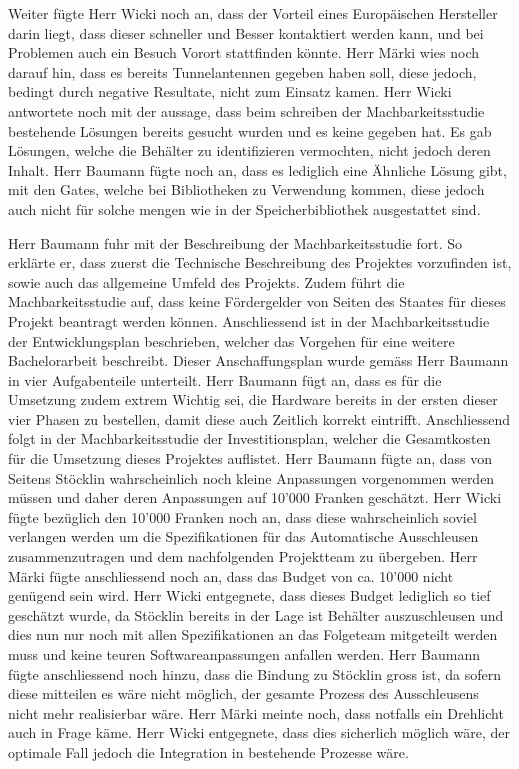 \documentclass[parskip=full, a4paper]{scrreprt}
\begin{document}
Weiter fügte Herr Wicki noch an, dass der Vorteil eines Europäischen Hersteller darin liegt, dass dieser schneller und Besser kontaktiert werden kann, und bei Problemen auch ein Besuch Vorort stattfinden könnte.
Herr Märki wies noch darauf hin, dass es bereits Tunnelantennen gegeben haben soll, diese jedoch, bedingt durch negative Resultate, nicht zum Einsatz kamen.
Herr Wicki antwortete noch mit der aussage, dass beim schreiben der Machbarkeitsstudie bestehende Lösungen bereits gesucht wurden und es keine gegeben hat. Es gab Lösungen, welche die Behälter zu identifizieren vermochten, nicht jedoch deren Inhalt. Herr Baumann fügte noch an, dass es lediglich eine Ähnliche Lösung gibt, mit den Gates, welche bei Bibliotheken zu Verwendung kommen, diese jedoch auch nicht für solche mengen wie in der Speicherbibliothek ausgestattet sind.

Herr Baumann fuhr mit der Beschreibung der Machbarkeitsstudie fort. So erklärte er, dass zuerst die Technische Beschreibung des Projektes vorzufinden ist, sowie auch das allgemeine Umfeld des Projekts. Zudem führt die Machbarkeitsstudie auf, dass keine Fördergelder von Seiten des Staates für dieses Projekt beantragt werden können. Anschliessend ist in der Machbarkeitsstudie der Entwicklungsplan beschrieben, welcher das Vorgehen für eine weitere Bachelorarbeit beschreibt. Dieser Anschaffungsplan wurde gemäss Herr Baumann in vier Aufgabenteile unterteilt. Herr Baumann fügt an, dass es für die Umsetzung zudem extrem Wichtig sei, die Hardware bereits in der ersten dieser vier Phasen zu bestellen, damit diese auch Zeitlich korrekt eintrifft. Anschliessend folgt in der Machbarkeitsstudie der Investitionsplan, welcher die Gesamtkosten für die Umsetzung dieses Projektes auflistet. Herr Baumann fügte an, dass von Seitens Stöcklin wahrscheinlich noch kleine Anpassungen vorgenommen werden müssen und daher deren Anpassungen auf 10'000 Franken geschätzt. Herr Wicki fügte bezüglich den 10'000 Franken noch an, dass diese wahrscheinlich soviel verlangen werden um die Spezifikationen für das Automatische Ausschleusen zusammenzutragen und dem nachfolgenden Projektteam zu übergeben. Herr Märki fügte anschliessend noch an, dass das Budget von ca. 10'000 nicht genügend sein wird. Herr Wicki entgegnete, dass dieses Budget lediglich so tief geschätzt wurde, da Stöcklin bereits in der Lage ist Behälter auszuschleusen und dies nun nur noch mit allen Spezifikationen an das Folgeteam mitgeteilt werden muss und keine teuren Softwareanpassungen anfallen werden. Herr Baumann fügte anschliessend noch hinzu, dass die Bindung zu Stöcklin gross ist, da sofern diese mitteilen es wäre nicht möglich, der gesamte Prozess des Ausschleusens nicht mehr realisierbar wäre. Herr Märki meinte noch, dass notfalls ein Drehlicht auch in Frage käme. Herr Wicki entgegnete, dass dies sicherlich möglich wäre, der optimale Fall jedoch die Integration in bestehende Prozesse wäre.
\end{document}
